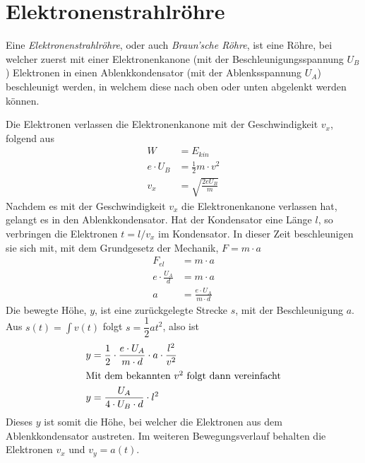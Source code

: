 \documentclass{article}
\begin{document}
\section{Elektronenstrahlröhre}
Eine \emph{Elektronenstrahlröhre}, oder auch \emph{Braun'sche Röhre}, ist eine Röhre, bei welcher zuerst mit einer Elektronenkanone (mit der Beschleunigungsspannung $U_B$) Elektronen in einen Ablenkkondensator (mit der Ablenksspannung $U_A$) beschleunigt werden, in welchem diese nach oben oder unten abgelenkt werden können.
 
Die Elektronen verlassen die Elektronenkanone mit der Geschwindigkeit $v_x$, folgend aus
\begin{align*}
 W &= E_{kin} \\
 e \cdot U_B &= \frac{1}{2} m \cdot v^2 \\
 v_x &= \sqrt{\frac{2 eU_B}{m}}
\end{align*}
Nachdem es mit der Geschwindigkeit $v_x$ die Elektronenkanone verlassen hat, gelangt es in den Ablenkkondensator. Hat der Kondensator eine Länge $l$, so verbringen die Elektronen $t=l/v_x$ im Kondensator. In dieser Zeit beschleunigen sie sich mit, mit dem Grundgesetz der Mechanik, $F= m \cdot a$
\begin{align*}
 F_{el} &= m \cdot a \\ 
 e \cdot \frac{U_A}{d} &= m \cdot a \\ 
 a &= \frac{e \cdot U_A}{m \cdot d} 
\end{align*}
Die bewegte Höhe, $y$, ist eine zurückgelegte Strecke $s$, mit der Beschleunigung $a$. Aus $\displaystyle {s(t) = \int v(t)}$ folgt ${s = \dfrac{1}{2}at^2}$, also ist
\begin{align*} 
 y &= \frac{1}{2} \cdot \frac{e \cdot U_A}{m \cdot d} \cdot a \cdot \frac{l^2}{v^2} \\
\intertext{Mit dem bekannten $v^2$ folgt dann vereinfacht} 
 y &= \frac{U_A}{4 \cdot U_B \cdot d} \cdot l^2
\end{align*}
Dieses $y$ ist somit die Höhe, bei welcher die Elektronen aus dem Ablenkkondensator austreten. Im weiteren Bewegungsverlauf behalten die Elektronen $v_x$ und $v_y = a(t)$.
 
 
\end{document}
